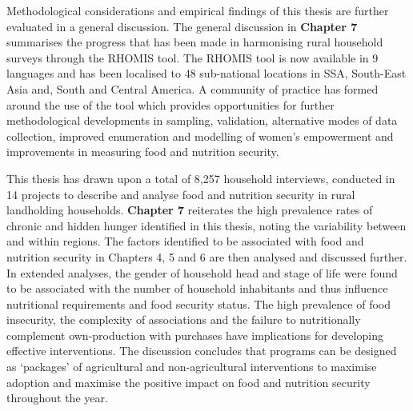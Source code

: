 Methodological considerations and empirical findings of this thesis are further evaluated in a general discussion. The general discussion in \textbf{Chapter 7} summarises the progress that has been made in harmonising rural household surveys through the RHOMIS tool. The RHOMIS tool is now available in 9 languages and has been localised to 48 sub-national locations in SSA, South-East Asia and, South and Central America. A community of practice has formed around the use of the tool which provides opportunities for further methodological developments in sampling, validation, alternative modes of data collection, improved enumeration and modelling of women's empowerment and improvements in measuring food and nutrition security.

This thesis has drawn upon a total of 8,257 household interviews, conducted in 14 projects to describe and analyse food and nutrition security in rural landholding households. \textbf{Chapter 7} reiterates the high prevalence rates of chronic and hidden hunger identified in this thesis, noting the variability between and within regions. The factors identified to be associated with food and nutrition security in Chapters 4, 5 and 6 are then analysed and discussed further. In extended analyses, the gender of household head and stage of life were found to be associated with the number of household inhabitants and thus influence nutritional requirements and food security status. The high prevalence of food insecurity, the complexity of associations and the failure to nutritionally complement own-production with purchases have implications for developing effective interventions. The discussion concludes that programs can be designed as `packages' of agricultural and non-agricultural interventions to maximise adoption and maximise the positive impact on food and nutrition security throughout the year.
